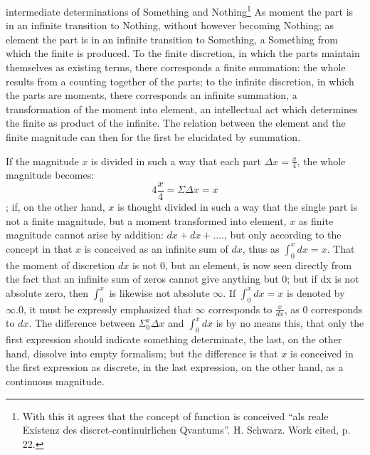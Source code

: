 \documentclass[12pt,a4paper,openany]{book}
\newcommand{\opage}[1]{\marginnote{\footnotesize\textit{[#1]}}}
\begin{document}
intermediate determinations of Something and Nothing\footnote[1]{With this it agrees that the concept of function is conceived ``als reale Existenz des discret-continuirlichen Qvantums''. H. Schwarz. Work cited, p. 22.} As moment
the part is in an infinite transition to Nothing, without however
becoming Nothing; as element the part is in an infinite transition %
to Something, a Something from which the finite is produced.
To the finite discretion, in which the parts maintain themselves as
existing terms, there corresponds a finite summation: the whole
results from a counting together of the parts; to the infinite
discretion, in which the parts are moments, there corresponds an
infinite summation, a transformation of the moment into
\setcounter{footnote}{0}%
\opage{102}element, an intellectual act which determines the finite
as product of the infinite. The relation between the element
and the finite magnitude can then for the first be elucidated
by summation.

If the magnitude $x$ is divided in such a way that each part $\Delta x=\frac{x}{4}$,
the whole magnitude becomes:
\[ 4\frac{x}{4}=\Sigma\Delta x=x \]
; if, on the other hand, $x$ is thought
divided in such a way that the single part is not a finite
magnitude, but a moment transformed into element, $x$ as finite magnitude cannot arise by addition: $dx+dx+\ldots.$, but only according to the concept in that $x$ is conceived
as an infinite sum of $dx$, thus as $\int_{0}^{x}dx=x$. That the moment of discretion $dx$ is not $0$, but an element, is now seen
directly from the fact that an infinite sum of zeros cannot give
anything but $0$; but if dx is not absolute zero, then $\int_{0}^{x}$ is likewise
not absolute $\infty$. If $\int_{0}^{x}dx=x$ is denoted by $\infty .0$, it must be
expressly emphasized that $\infty$ corresponds to $\frac{x}{dx}$, as $0$ corresponds to $dx$. The difference between $\Sigma_{0}^{x}\Delta x$ and $\int_{0}^{x}dx$ is by no means this,
that only the first expression should indicate something determinate,
the last, on the other hand, dissolve into empty formalism; but
the difference is that $x$ is conceived in the first expression as discrete,
in the last expression, on the other hand, as a continuous magnitude.
\end{document}
